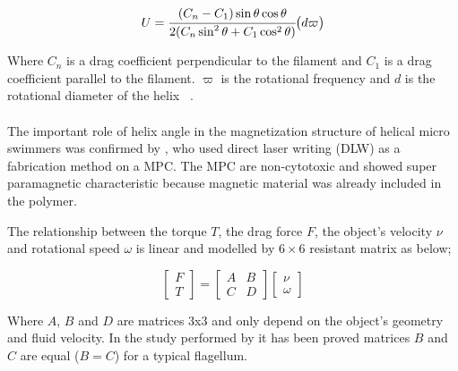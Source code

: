 \documentclass[12pt,a4paper,titlepage]{report}
\begin{document}
\begin{equation}
  U = {\cfrac{(C_n - C_1) \sin \theta \cos \theta}{2(C_n \sin^2 \theta + C_1 \cos^2 \theta)}} \big( d \varpi \big)
\end{equation} 

Where $C_n$ is a drag coefficient perpendicular to the filament and $C_1$ is a drag coefficient
 parallel to the filament. $ \varpi$ is the rotational frequency and $d$ is the rotational diameter of 
the helix ~\citep{tottori2012magnetic}.  



\paragraph{}
The important role of helix angle in the magnetization structure of helical micro swimmers 
was confirmed by \citeauthor{peyer2013bacteria} \citep{peyer2013bacteria}, who used direct laser writing (DLW) as a fabrication method 
 on a \ac*{MPC}. The \ac*{MPC} are non-cytotoxic and showed 
super paramagnetic characteristic because magnetic material was already included in the polymer. 

The relationship between the torque $T$, the drag force $F$, the object\rq{}s velocity $\nu$ and rotational 
speed $\omega$ is linear and modelled by $6\times6$ resistant matrix as below;



\[
\begin{bmatrix} F\\ 
T \end{bmatrix}  =\begin{bmatrix} A & B \\ 
C & D \end{bmatrix}  \begin{bmatrix} \nu
 \\ \omega
\end{bmatrix}
\]




Where $A$, $B$ and $D$ are matrices 3x3 and only depend on the object\rq{}s geometry and fluid velocity.
In the study performed by \citeauthor{purcell1997efficiency} \citep{purcell1997efficiency} it has been proved 
matrices $B$ and $C$ are equal ($B = C$) for a typical flagellum. 
\end{document}
